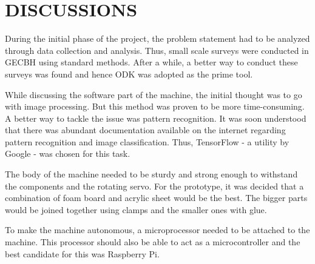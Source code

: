 \chapter{DISCUSSIONS}\label{chap5}
\thispagestyle{empty}

During the initial phase of the project, the problem statement had to be analyzed through data collection and analysis. Thus, small scale surveys were conducted in GECBH using standard methods. After a while, a better way to conduct these surveys was found and hence ODK was adopted as the prime tool.

While discussing the software part of the machine, the initial thought was to go with image processing. But this method was proven to be more time-consuming. A better way to tackle the issue was pattern recognition. It was soon understood that there was abundant documentation available on the internet regarding pattern recognition and image classification. Thus, TensorFlow - a utility by Google - was chosen for this task.

The body of the machine needed to be sturdy and strong enough to withstand the components and the rotating servo. For the prototype, it was decided that a combination of foam board and  acrylic sheet would be the best. The bigger parts would be joined together using clamps and the smaller ones with glue.

To make the machine autonomous, a microprocessor needed to be attached to the machine. This processor should also be able to act as a microcontroller and the best candidate for this was Raspberry Pi.
